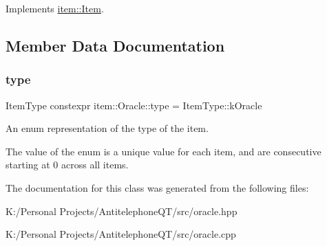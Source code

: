 Implements \hyperlink{classitem_1_1_item_afef6bdd5c1c734c67122e4118e9e1930}{item\+::\+Item}.



\subsection{Member Data Documentation}
\mbox{\label{classitem_1_1_oracle_a6905378f36854ca2ef63d403c95ede8f}} 
\subsubsection{\texorpdfstring{type}{type}}
{\footnotesize\ttfamily Item\+Type constexpr item\+::\+Oracle\+::type = Item\+Type\+::k\+Oracle\hspace{0.3cm}{\ttfamily [static]}}



An enum representation of the type of the item. 

The value of the enum is a unique value for each item, and are consecutive starting at 0 across all items. 

The documentation for this class was generated from the following files\+:\begin{DoxyCompactItemize}
\item 
K\+:/\+Personal Projects/\+Antitelephone\+Q\+T/src/oracle.\+hpp\item 
K\+:/\+Personal Projects/\+Antitelephone\+Q\+T/src/oracle.\+cpp\end{DoxyCompactItemize}
